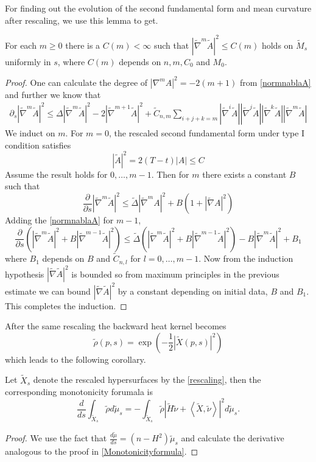 For finding out the evolution of the second fundamental form and mean curvature after rescaling, we use this lemma to get.
\begin{proposition}
    For each $ m \ge 0 $ there is a $ C(m) < \infty $ such that $ |\tilde{\nabla}^{m} \tilde{A}|^{2} \le C(m)$ holds on $ \tilde{M}_{s} $ uniformly in $ s $, where $ C(m) $ depends on $ n,m,C_{0} $ and $ M_{0} $. 
\end{proposition}
\begin{proof}
   One can calculate the degree of $ |\nabla^{m} A|^{2}  = -2(m+1)$ from \cref{normnablaA} and further we know that 
   \begin{align*}
    \partial_{s}|\tilde{\nabla}^{m}\tilde{A}|^{2} \le \Delta|\tilde{\nabla}^{m}\tilde{A}|^{2} - 2|\tilde{\nabla}^{m+1}\tilde{A}|^{2} + \tilde{C}_{n,m}\sum_{i+j+k=m}^{}|\tilde{\nabla}^{i}\tilde{A}|  |\tilde{\nabla}^{j}\tilde{A}|| \tilde{\nabla}^{k}\tilde{A}|| \tilde{\nabla}^{m}\tilde{A}|
\end{align*}
   We induct on $ m $. For $ m = 0 $, the rescaled second fundamental form under type I condition satisfies 
   \[ |\tilde{A}|^{2} = 2(T-t)|A| \le C \]
   Assume the result holds for $ 0,\dots, m-1 $. Then for $ m $ there exists a constant $ B $ such that 
   \[ \frac{\partial}{\partial s}| \tilde{\nabla}^{m} \tilde{A}|^{2}  \le \tilde{\Delta}| \tilde{ \nabla}^{m}A|^{2} + B (1+|\tilde{\nabla}A|^{2})\]
   Adding the \cref{normnablaA} for $ m-1 $, 
   \[ \frac{\partial}{\partial s}(|\tilde{\nabla}^{m} \tilde{A}|^{2}+ B| \tilde{\nabla}^{m-1} \tilde{A}|^{2}) \le \tilde{\Delta}(|\tilde{\nabla}^{m} \tilde{A}|^{2}+ B| \tilde{\nabla}^{m-1} \tilde{A}|^{2})  - B|\tilde{\nabla}^{m}\tilde{A}|^{2}+ B_{1}\]
   where $ B_{1} $ depends on $ B $ and $ \tilde{C}_{n,l} $ for $ l = 0, \dots, m-1 $. Now from the induction hypothesis $ |\tilde{\nabla}\tilde{A}|^{2} $ is bounded so from maximum principles in the previous estimate we can bound $ |\tilde{\nabla} \tilde{A}|^{2} $ by a constant depending on initial data, $ B $ and $ B_{1} $. This completes the induction.
\end{proof}

After the same rescaling the backward heat kernel becomes
\[ \tilde{\rho}(p,s) = \exp \left( - \frac{1}{2}| \tilde{X}(p,s)|^{2} \right) \]
which leads to the following corollary.
\begin{corollary}
    Let $ \tilde{X}_{s} $ denote the rescaled hypersurfaces by the \cref{rescaling}, then the corresponding monotonicity forumala is 
    \[ \frac{d}{d s} \int_{\tilde{X}_{s}} \tilde{\rho} d \tilde{\mu}_{s}=  - \int_{\tilde{X}_{s}} \tilde{\rho}| \tilde{H} \tilde{\nu}+ \left< \tilde{X}, \tilde{\nu} \right> |^{2}d \tilde{\mu}_{s}.\]
\end{corollary}
\begin{proof}
    We use the fact that $ \frac{d \tilde{\mu}}{ds} = (n-H^{2}) \tilde{\mu}_{s} $ and calculate the derivative analogous to the proof in \cref{Monotonicityformula}.
\end{proof}

